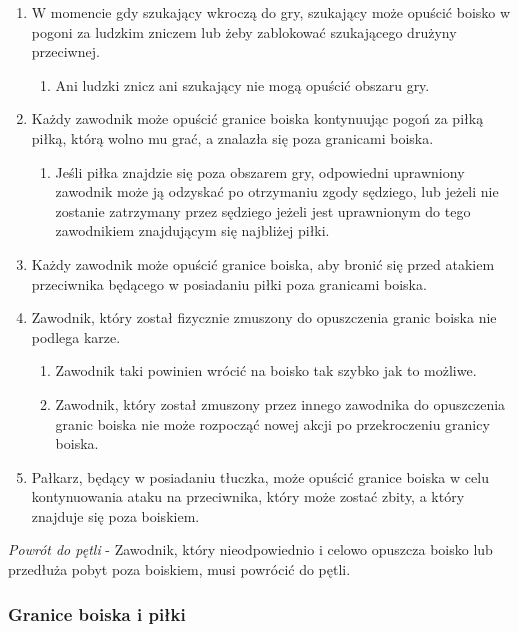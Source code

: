 \documentclass[12pt]{article}
\begin{document}
\begin{enumerate}
\item
    W momencie gdy szukający wkroczą do gry, szukający może opuścić boisko
  w pogoni za ludzkim zniczem lub żeby zablokować szukającego drużyny
  przeciwnej.
  
  \begin{enumerate}
  \item
        Ani ludzki znicz ani szukający nie mogą opuścić obszaru gry.
      \end{enumerate}
\item
    Każdy zawodnik może opuścić granice boiska kontynuując pogoń za piłką
  piłką, którą wolno mu grać, a znalazła się poza granicami boiska.
  
  \begin{enumerate}
  \item
        Jeśli piłka znajdzie się poza obszarem gry, odpowiedni uprawniony
    zawodnik może ją odzyskać po otrzymaniu zgody sędziego, lub jeżeli
    nie zostanie zatrzymany przez sędziego jeżeli jest uprawnionym do
    tego zawodnikiem znajdującym się najbliżej piłki.
      \end{enumerate}
\item
    Każdy zawodnik może opuścić granice boiska, aby bronić się przed
  atakiem przeciwnika będącego w posiadaniu piłki poza granicami boiska.
  \item
    Zawodnik, który został fizycznie zmuszony do opuszczenia granic boiska
  nie podlega karze.
  
  \begin{enumerate}
  \item
        Zawodnik taki powinien wrócić na boisko tak szybko jak to możliwe.
      \item
        Zawodnik, który został zmuszony przez innego zawodnika do
    opuszczenia granic boiska nie może rozpocząć nowej akcji po
    przekroczeniu granicy boiska.
      \end{enumerate}
\item
    Pałkarz, będący w posiadaniu tłuczka, może opuścić granice boiska w
  celu kontynuowania ataku na przeciwnika, który może zostać zbity, a
  który znajduje się poza boiskiem.
  \end{enumerate}

\emph{Powrót do pętli} - Zawodnik, który nieodpowiednio i celowo opuszcza
boisko lub przedłuża pobyt poza boiskiem, musi powrócić do pętli.

\subsubsection{Granice boiska i piłki}
\end{document}
